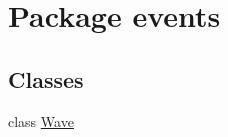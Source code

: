 \hypertarget{namespaceevents}{}\section{Package events}
\label{namespaceevents}
\subsection*{Classes}
\begin{DoxyCompactItemize}
\item 
class \hyperlink{classevents_1_1_wave}{Wave}
\end{DoxyCompactItemize}
